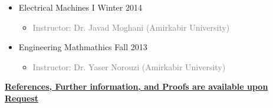 \documentclass[10pt,a4paper,sans]{moderncv} %
\begin{document}
\begin{itemize}
\begin{itemize}
			\item {} Electrical Machines I \hfill Winter 2014
			\begin{itemize} 
				\item \textcolor{gray}{Instructor: Dr. Javad Moghani (Amirkabir University)}
			\end{itemize}
			
			\item {} Engineering Mathmathics \hfill Fall 2013
			\begin{itemize} 
				\item\textcolor{gray}{Instructor: Dr. Yaser Norouzi (Amirkabir University)} 
				\newline
			\end{itemize}
			
		\end{itemize}
	\end{itemize}
	
	
	\centerline{\underline{\textbf{	\faExclamationCircle \hspace{0.5 pt} References, Further information, and Proofs are available upon Request}}}
	
\end{document}
